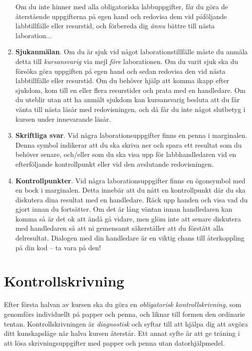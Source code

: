 \begin{enumerate}
Om du inte hinner med alla obligatoriska labbuppgifter, får du göra de återstående uppgifterna på egen hand och redovisa dem vid påföljande labbtillfälle eller resurstid, och förbereda dig \emph{ännu} bättre till nästa laboration...

\item \textbf{Sjukanmälan}. Om du är sjuk vid något laborationstillfälle måste du anmäla detta till \emph{kursansvarig} via mejl \emph{före} laborationen. Om du varit sjuk ska du försöka göra uppgiften på egen hand och sedan redovisa den vid nästa labbtillfälle eller resurstid. Om du behöver hjälp att komma ikapp efter sjukdom, kom till en eller flera resurstider och prata med en handledare. Om du uteblir utan att ha anmält sjukdom kan kursansvarig besluta att du får vänta till nästa läsår med redovisningen, och då får du inte något slutbetyg i kursen under innevarande läsår.

\item\Pen \textbf{Skriftliga svar}. Vid några laborationsuppgifter finns en penna i marginalen. Denna symbol indikerar att du ska skriva ner och spara ett resultat som du behöver senare, och/eller som du ska visa upp för labbhandledaren vid en efterföljande kontrollpunkt eller vid den avslutande redovisningen.

\item\Checkpoint \textbf{Kontrollpunkter}. Vid några laborationsuppgifter finns en ögonsymbol med en bock i marginalen. Detta innebär att du nått en kontrollpunkt där du ska diskutera dina resultat med en handledare. Räck upp handen och visa vad du gjort innan du fortsätter. Om det är lång väntan innan  handledaren kan komma så är det ok att ändå gå vidare, men glöm inte att senare diskutera med handledaren så att ni gemensamt säkerställer att du förstått alla delresultat. Dialogen med din handledare är en viktig chans till återkoppling på din kod -- ta vara på den!

\end{enumerate}

\section{Kontrollskrivning}\label{section:diagnostic-test}

Efter första halvan av kursen ska du göra en \emph{obligatorisk kontrollskrivning}, som genomförs individuellt på papper och penna, och liknar till formen den ordinarie tentan. Kontrollskrivningen är \emph{diagnostisk} och syftar till att hjälpa dig att avgöra ditt kunskapsläge när halva kursen återstår. Ett annat syfte är att ge träning i att lösa skrivningsuppgifter med papper och penna utan datorhjälpmedel.

